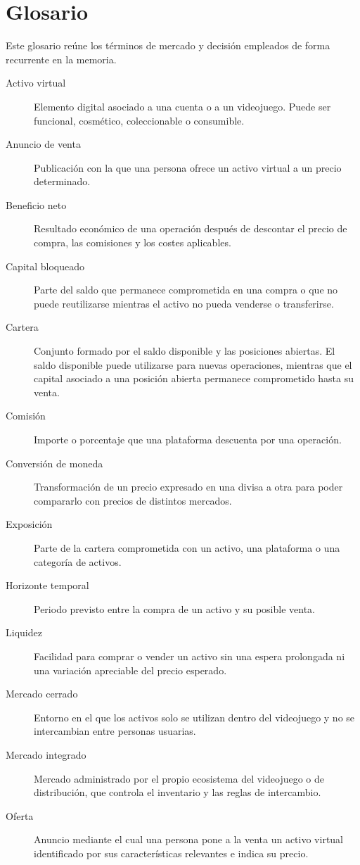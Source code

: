 \chapter*{Glosario}
\indicetoprule

Este glosario reúne los términos de mercado y decisión empleados de forma recurrente en la memoria.
\begin{description}
  \item[Activo virtual] Elemento digital asociado a una cuenta o a un videojuego. Puede ser funcional, cosmético, coleccionable o consumible.
  \item[Anuncio de venta] Publicación con la que una persona ofrece un activo virtual a un precio determinado.
  \item[Beneficio neto] Resultado económico de una operación después de descontar el precio de compra, las comisiones y los costes aplicables.
  \item[Capital bloqueado] Parte del saldo que permanece comprometida en una compra o que no puede reutilizarse mientras el activo no pueda venderse o transferirse.
  \item[Cartera] Conjunto formado por el saldo disponible y las posiciones abiertas. El saldo disponible puede utilizarse para nuevas operaciones, mientras que el capital asociado a una posición abierta permanece comprometido hasta su venta.
  \item[Comisión] Importe o porcentaje que una plataforma descuenta por una operación.
  \item[Conversión de moneda] Transformación de un precio expresado en una divisa a otra para poder compararlo con precios de distintos mercados.
  \item[Exposición] Parte de la cartera comprometida con un activo, una plataforma o una categoría de activos.
  \item[Horizonte temporal] Periodo previsto entre la compra de un activo y su posible venta.
  \item[Liquidez] Facilidad para comprar o vender un activo sin una espera prolongada ni una variación apreciable del precio esperado.
  \item[Mercado cerrado] Entorno en el que los activos solo se utilizan dentro del videojuego y no se intercambian entre personas usuarias.
  \item[Mercado integrado] Mercado administrado por el propio ecosistema del videojuego o de distribución, que controla el inventario y las reglas de intercambio.
  \item[Oferta] Anuncio mediante el cual una persona pone a la venta un activo virtual identificado por sus características relevantes e indica su precio.

\end{description}
